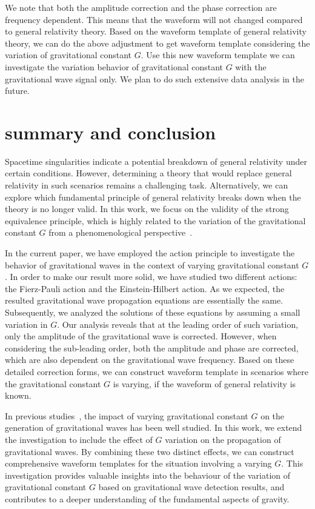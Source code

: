 \documentclass[prd,aps,a4paper,superscriptaddress,onecolumn,nofootinbib]{revtex4}
\begin{document}
We note that both the amplitude correction and the phase correction are frequency dependent. This means that the waveform will not changed compared to general relativity theory. Based on the waveform template of general relativity theory, we can do the above adjustment to get waveform template considering the variation of gravitational constant $G$. Use this new waveform template we can investigate the variation behavior of gravitational constant $G$ with the gravitational wave signal only. We plan to do such extensive data analysis in the future.

\section{summary and conclusion}
Spacetime singularities indicate a potential breakdown of general relativity under certain conditions. However, determining a theory that would replace general relativity in such scenarios remains a challenging task. Alternatively, we can explore which fundamental principle of general relativity breaks down when the theory is no longer valid. In this work, we focus on the validity of the strong equivalence principle, which is highly related to the variation of the gravitational constant $G$ from a phenomenological perspective~\cite{RevModPhys.75.403,Uzan2011}.

In the current paper, we have employed the action principle to investigate the behavior of gravitational waves in the context of varying gravitational constant $G$. In order to make our result more solid, we have studied two different actions: the Fierz-Pauli action and the Einstein-Hilbert action. As we expected, the resulted gravitational wave propagation equations are essentially the same. Subsequently, we analyzed the solutions of these equations by assuming a small variation in $G$. Our analysis reveals that at the leading order of such variation, only the amplitude of the gravitational wave is corrected. However, when considering the sub-leading order, both the amplitude and phase are corrected, which are also dependent on the gravitational wave frequency. Based on these detailed correction forms, we can construct waveform template in scenarios where the gravitational constant $G$ is varying, if the waveform of general relativity is known.

In previous studies~\cite{WANG2022137416,PhysRevD.107.064073}, the impact of varying gravitational constant $G$ on the generation of gravitational waves has been well studied. In this work, we extend the investigation to include the effect of $G$ variation on the propagation of gravitational waves. By combining these two distinct effects, we can construct comprehensive waveform templates for the situation involving a varying $G$. This investigation provides valuable insights into the behaviour of the variation of gravitational constant $G$ based on gravitational wave detection results, and contributes to a deeper understanding of the fundamental aspects of gravity.


\end{document}
